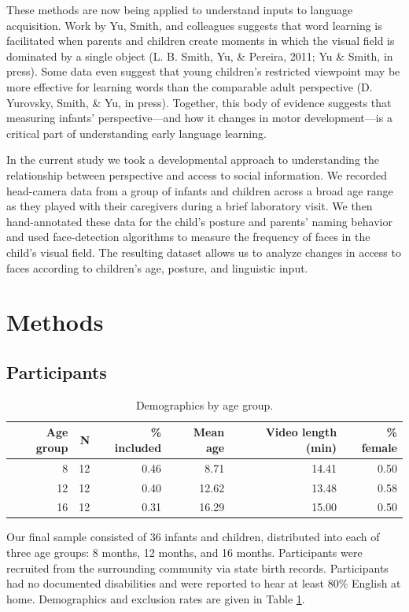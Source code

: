 \documentclass[a4paper,man,apacite,floatsintext,longtable]{apa6}
\begin{document}
These methods are now being applied to understand inputs to language
acquisition. Work by Yu, Smith, and colleagues suggests that word
learning is facilitated when parents and children create moments in
which the visual field is dominated by a single object (L. B. Smith, Yu,
\& Pereira, 2011; Yu \& Smith, in press). Some data even suggest that
young children's restricted viewpoint may be more effective for learning
words than the comparable adult perspective (D. Yurovsky, Smith, \& Yu,
in press). Together, this body of evidence suggests that measuring
infants' perspective---and how it changes in motor development---is a
critical part of understanding early language learning.

In the current study we took a developmental approach to understanding
the relationship between perspective and access to social information.
We recorded head-camera data from a group of infants and children across
a broad age range as they played with their caregivers during a brief
laboratory visit. We then hand-annotated these data for the child's
posture and parents' naming behavior and used face-detection algorithms
to measure the frequency of faces in the child's visual field. The
resulting dataset allows us to analyze changes in access to faces
according to children's age, posture, and linguistic input.

\section{Methods}\label{methods}

\subsection{Participants}\label{participants}

\begin{table}[ht]
\centering
\begin{tabular}{rrrrrr}
  \hline
Age group & N & \% included & Mean age & Video length (min) & \% female \\ 
  \hline
  8 &  12 & 0.46 & 8.71 & 14.41 & 0.50 \\ 
   12 &  12 & 0.40 & 12.62 & 13.48 & 0.58 \\ 
   16 &  12 & 0.31 & 16.29 & 15.00 & 0.50 \\ 
   \hline
\end{tabular}
\caption{\label{tab:pop} Demographics by age group.}
\end{table}

Our final sample consisted of 36 infants and children, distributed into
each of three age groups: 8 months, 12 months, and 16 months.
Participants were recruited from the surrounding community via state
birth records. Participants had no documented disabilities and were
reported to hear at least 80\% English at home. Demographics and
exclusion rates are given in Table \ref{tab:pop}.
\end{document}
